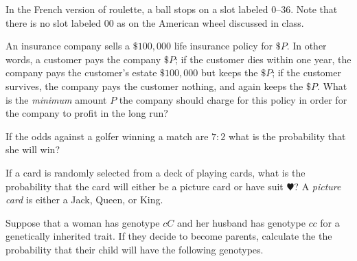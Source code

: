 \documentclass[addpoints,12pt]{exam}
\begin{document}
\begin{questions}

\question[12] In the French version of roulette, a ball stops
on a slot labeled $0$--$36$. Note that there is no slot labeled
$00$ as on the American wheel discussed in class.

\question[12] An insurance company sells a $\$100,000$
life insurance policy for $\$P$. 
In other words, a customer pays the company $\$P$;
if the customer dies within one year, the company
pays the customer's estate $\$100,000$ but keeps the $\$P$;
if the customer survives, the company pays the customer nothing, and again
keeps the $\$P$. What is the {\em minimum} amount $P$ the
company should charge for this policy in order
for the company to profit in the long run?

\question[8] If the odds against a golfer winning a match
are $7:2$ what is the probability that she will win?

\question[10] If a card is randomly selected from a deck
of playing cards, what is the probability that the card
will either be a picture card or have suit $\varheart$?
A {\em picture card} is either a Jack, Queen, or King.

\question[12]
Suppose that a woman has genotype $cC$
and her husband has genotype $cc$ for a
genetically inherited trait.
If they decide to become parents, calculate the
the probability that their child will
have the following genotypes.
\end{questions}
\end{document}
